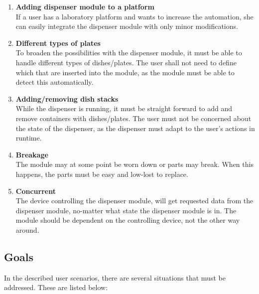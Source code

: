 \documentclass[10pt,a4paper]{article}
\begin{document}
	
	\begin{enumerate}
		\item \textbf{Adding dispenser module to a platform}\\
		If a user has a laboratory platform and wants to increase the automation, she can easily integrate the dispenser module with only minor modifications.
		
		\item \textbf{Different types of plates}\\
		To broaden the possibilities with the dispenser module, it must be able to handle different types of dishes/plates. The user shall not need to define which that are inserted into the module, as the module must be able to detect this automatically.
		
		\item \textbf{Adding/removing dish stacks}\\
		While the dispenser is running, it must be straight forward to add and remove containers with dishes/plates. The user must not be concerned about the state of the dispenser, as the dispenser must adapt to the user's actions in runtime.
		
		\item \textbf{Breakage}\\
		The module may at some point be worn down or parts may break. When this happens, the parts must be easy and low-lost to replace.
		
		\item \textbf{Concurrent }\\
		The device controlling the dispenser module, will get requested data from the dispenser module, no-matter what state the dispenser module is in. The module should be dependent on the controlling device, not the other way around.
		
		
	\end{enumerate}
	
	\subsection{Goals}\label{subsec_Goals}
	In the described user scenarios, there are several situations that must be addressed. These are listed below:
	
\end{document}
